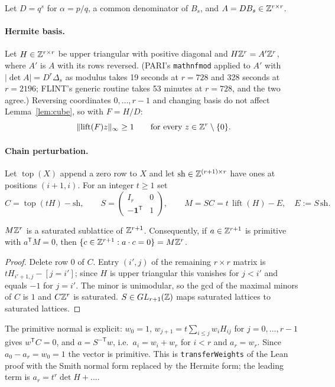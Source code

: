 \documentclass[11pt]{article}
\newcommand{\lift}{\operatorname{lift}}
\begin{document}
Let $D=q^s$ for $\alpha=p/q$, a common denominator of $B_s$, and $A=DB_s\in\mathbb{Z}^{r\times r}$.

\paragraph{Hermite basis.} Let $H\in\mathbb{Z}^{r\times r}$ be upper triangular with positive diagonal
and $H\mathbb{Z}^r=A'\mathbb{Z}^r$, where $A'$ is $A$ with its rows reversed. (PARI's \texttt{mathnfmod} applied to $A'$
with $|\det A|=D^r\Delta_s$ as modulus takes 19 seconds at $r=728$ and 328 seconds at $r=2196$; FLINT's generic
routine takes 53 minutes at $r=728$, and the two agree.) Reversing coordinates $0,\dots,r-1$ and
changing basis do not affect Lemma~\ref{lem:cube}, so with $F=H/D$:
\begin{equation}\label{eq:CA}
\norm{\lift(F)z}_\infty\ge1\qquad\text{for every }z\in\Z^r\setminus\{0\}.
\end{equation}

\paragraph{Chain perturbation.} Let $\operatorname{top}(X)$ append a zero row to $X$ and let
$\mathrm{sh}\in\mathbb{Z}^{(r+1)\times r}$ have ones at positions $(i+1,i)$. For an integer $t\ge1$ set
\[
C=\operatorname{top}(tH)-\mathrm{sh},\qquad
S=\begin{pmatrix}I_r&0\\-\mathbf 1^{\mathsf T}&1\end{pmatrix},\qquad
M=SC=t\,\lift(H)-E,\quad E:=S\,\mathrm{sh}.
\]

\begin{lemma}[saturation]\label{lem:sat}
$M\mathbb{Z}^r$ is a saturated sublattice of $\mathbb{Z}^{r+1}$. Consequently, if $a\in\mathbb{Z}^{r+1}$ is primitive
with $a^{\mathsf T}M=0$, then $\{c\in\mathbb{Z}^{r+1}:a\cdot c=0\}=M\mathbb{Z}^r$.
\end{lemma}

\begin{proof}
Delete row $0$ of $C$. Entry $(i',j)$ of the remaining $r\times r$ matrix is
$tH_{i'+1,j}-[j=i']$; since $H$ is upper triangular this vanishes for $j<i'$ and equals $-1$
for $j=i'$. The minor is unimodular, so the gcd of the maximal minors of $C$ is $1$ and
$C\mathbb{Z}^r$ is saturated. $S\in GL_{r+1}(\mathbb{Z})$ maps saturated lattices to saturated lattices.
\end{proof}

The primitive normal is explicit: $w_0=1$, $w_{j+1}=t\sum_{i\le j}w_iH_{ij}$ for
$j=0,\dots,r-1$ gives $w^{\mathsf T}C=0$, and $a=S^{-\mathsf T}w$, i.e.\ $a_i=w_i+w_r$ for
$i<r$ and $a_r=w_r$. Since $a_0-a_r=w_0=1$ the vector is primitive. This is \texttt{transferWeights} of the Lean proof with the Smith
normal form replaced by the Hermite form; the leading term is $a_r=t^r\det H+\dots$.
\end{document}
